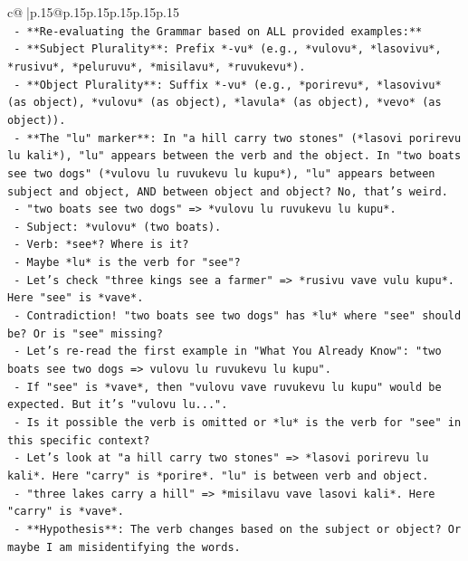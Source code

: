 \documentclass{article}
\begin{document}
{\begin{supertabular}{c@{$\;$}|p{.15\linewidth}@{}p{.15\linewidth}p{.15\linewidth}p{.15\linewidth}p{.15\linewidth}p{.15\linewidth}}
{{{\\ 
\texttt{   {-} **Re{-}evaluating the Grammar based on ALL provided examples:**} \\
\texttt{     {-} **Subject Plurality**: Prefix *{-}vu* (e.g., *vulovu*, *lasovivu*, *rusivu*, *peluruvu*, *misilavu*, *ruvukevu*).} \\
\texttt{     {-} **Object Plurality**: Suffix *{-}vu* (e.g., *porirevu*, *lasovivu* (as object), *vulovu* (as object), *lavula* (as object), *vevo* (as object)).} \\
\texttt{     {-} **The "lu" marker**: In "a hill carry two stones" (*lasovi porirevu lu kali*), "lu" appears between the verb and the object. In "two boats see two dogs" (*vulovu lu ruvukevu lu kupu*), "lu" appears between subject and object, AND between object and object? No, that's weird.} \\
\texttt{       {-} "two boats see two dogs" => *vulovu lu ruvukevu lu kupu*.} \\
\texttt{         {-} Subject: *vulovu* (two boats).} \\
\texttt{         {-} Verb: *see*? Where is it?} \\
\texttt{         {-} Maybe *lu* is the verb for "see"?} \\
\texttt{         {-} Let's check "three kings see a farmer" => *rusivu vave vulu kupu*. Here "see" is *vave*.} \\
\texttt{         {-} Contradiction! "two boats see two dogs" has *lu* where "see" should be? Or is "see" missing?} \\
\texttt{         {-} Let's re{-}read the first example in "What You Already Know": "two boats see two dogs => vulovu lu ruvukevu lu kupu".} \\
\texttt{         {-} If "see" is *vave*, then "vulovu vave ruvukevu lu kupu" would be expected. But it's "vulovu lu...".} \\
\texttt{         {-} Is it possible the verb is omitted or *lu* is the verb for "see" in this specific context?} \\
\texttt{         {-} Let's look at "a hill carry two stones" => *lasovi porirevu lu kali*. Here "carry" is *porire*. "lu" is between verb and object.} \\
\texttt{         {-} "three lakes carry a hill" => *misilavu vave lasovi kali*. Here "carry" is *vave*.} \\
\texttt{         {-} **Hypothesis**: The verb changes based on the subject or object? Or maybe I am misidentifying the words.} \\
}}}
\end{supertabular}}
\end{document}
